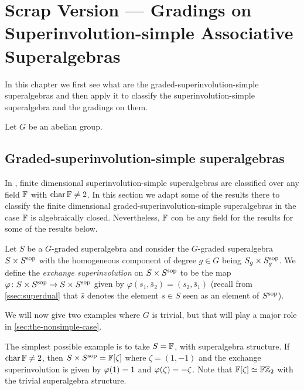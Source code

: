 \chapter{Scrap Version --- Gradings on Superinvolution-simple Associative Superalgebras}

In this chapter we first see what are the graded-superinvolution-simple superalgebras and then apply it to classify the superinvolution-simple superalgebra and the gradings on them. 

Let $G$ be an abelian group. 

\section{Graded-superinvolution-simple superalgebras}

In \cite{racine}, finite dimensional superinvolution-simple superalgebras are classified over any field $\mathbb{F}$ with $\operatorname{char} \mathbb{F} \neq 2$. 
In this section we adapt some of the results there to classify the finite dimensional graded-superinvolution-simple superalgebras in the case $\mathbb{F}$ is algebraically closed. 
Nevertheless, $\mathbb{F}$ con be any field for the results for some of the results below. 


\begin{defi}\label{def:SxSsop}
	Let $S$ be a $G$-graded superalgebra and consider the $G$-graded superalgebra $S \times S^{\mathrm{sop}}$ with the homogeneous component of degree $g\in G$ being $S_g \times S^{\mathrm{sop}}_g$. 
	We define the \emph{exchange superinvolution} on $S \times S^{\mathrm{sop}}$ to be the map $\varphi\colon S \times S^{\mathrm{sop}} \to S \times S^{\mathrm{sop}}$ given by $\varphi (s_1, \bar s_2) = (s_2, \bar s_1)$ (recall from \cref{ssec:superdual} that $\bar s$ denotes the element $s \in S$ seen as an element of $S^{\mathrm{sop}}$). 
\end{defi}

We will now give two examples where $G$ is trivial, but that will play a major role in \cref{sec:the-nonsimple-case}.

\begin{ex}\label{ex:FxF-iso-FZ2}
	The simplest possible example is to take $S = \mathbb{F}$, with superalgebra structure. 
	If $\operatorname{char} \mathbb{F} \neq 2$, then $S\times S^{\mathrm{sop}} = \mathbb{F} [\zeta]$ where $\zeta = (1, -1)$ and the exchange superinvolution is given by $\varphi(1) = 1$ and $\varphi(\zeta) = -\zeta$.
	Note that $\mathbb{F} [\zeta] \simeq \mathbb{F}\mathbb{Z}_2$ with the trivial superalgebra structure. 
\end{ex}

